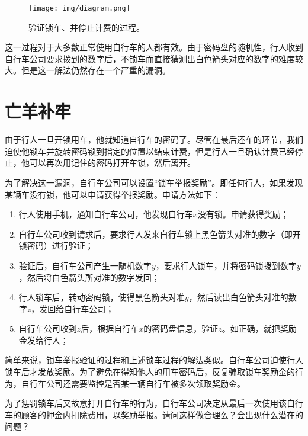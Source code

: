 \documentclass[UTF8]{article}
\begin{document}
\begin{figure}[htbp]
  \centering
  \texttt{[image: img/diagram.png]}
  \caption{验证锁车、并停止计费的过程。}
  \label{fig:lock-diagram}
\end{figure}

这一过程对于大多数正常使用自行车的人都有效。由于密码盘的随机性，行人收到自行车公司要求拨到的数字后，不锁车而直接猜测出白色箭头对应的数字的难度较大。但是这一解法仍然存在一个严重的漏洞。

\section{亡羊补牢}
由于行人一旦开锁用车，他就知道自行车的密码了。尽管在最后还车的环节，我们迫使他锁车并旋转密码锁到指定的位置以结束计费，但是行人一旦确认计费已经停止，他可以再次用记住的密码打开车锁，然后离开。

为了解决这一漏洞，自行车公司可以设置“锁车举报奖励”。即任何行人，如果发现某辆车没有锁，他可以申请获得举报奖励。申请方法如下：

\begin{enumerate}
\item 行人使用手机，通知自行车公司，他发现自行车$x$没有锁。申请获得奖励；
\item 自行车公司收到请求后，要求行人发来自行车锁上黑色箭头对准的数字（即开锁密码）进行验证；
\item 验证后，自行车公司产生一随机数字$y$，要求行人锁车，并将密码锁拨到数字$y$，然后将白色箭头所对准的数字发回；
\item 行人锁车后，转动密码锁，使得黑色箭头对准$y$，然后读出白色箭头对准的数字$z$，发回给自行车公司；
\item 自行车公司收到$z$后，根据自行车$x$的密码盘信息，验证$z$。如正确，就把奖励金发给行人；
\end{enumerate}

简单来说，锁车举报验证的过程和上述锁车过程的解法类似。自行车公司迫使行人锁车后才发放奖励。为了避免在得知他人的用车密码后，反复骗取锁车奖励金的行为，自行车公司还需要监控是否某一辆自行车被多次领取奖励金。

\begin{Exercise}
为了惩罚锁车后又故意打开自行车的行为，自行车公司决定从最后一次使用该自行车的顾客的押金内扣除费用，以奖励举报。请问这样做合理么？会出现什么潜在的问题？
\end{Exercise}

\ifx\wholebook\relax \else
\end{document}
